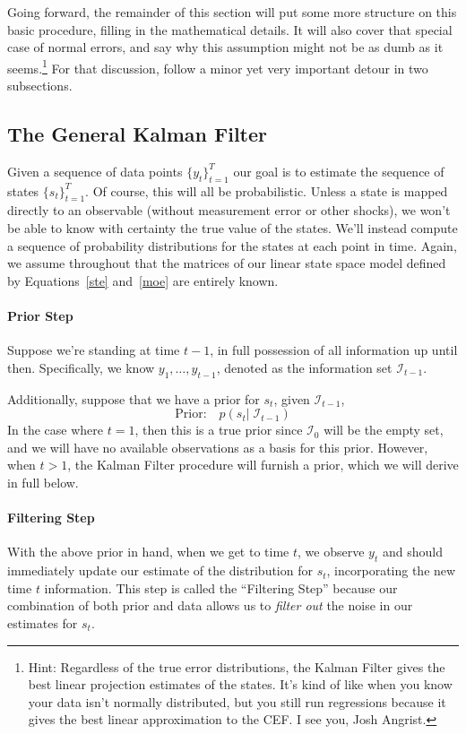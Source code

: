\documentclass[a4paper,12pt]{article}
\begin{document}
Going forward, the remainder of this section will put some more
structure on this basic procedure, filling in the mathematical details.
It will also cover that special case of normal errors, and say why this
assumption might not be as dumb as it seems.\footnote{Hint: Regardless
of the true error distributions, the Kalman Filter gives the best linear
projection estimates of the states. It's kind of like when you know your
data isn't normally distributed, but you still run regressions because
it gives the best linear approximation to the CEF. I see you, Josh
Angrist.} For that discussion, follow a minor yet very important detour
in two subsections.


\subsection{The General Kalman Filter}
\label{subsec:kfdetails}

Given a sequence of data points $\{y_t\}_{t=1}^T$ our goal is to
estimate the sequence of states $\{s_t\}^T_{t=1}$. Of course, this will
all be probabilistic. Unless a state is mapped directly to an
observable (without measurement error or other shocks), we won't be able
to know with certainty the true value of the states. We'll instead
compute a sequence of probability distributions for the states at each
point in time. Again, we assume throughout that the matrices of our
linear state space model defined by Equations~\ref{ste}
and~\ref{moe} are entirely known.


\paragraph{Prior Step} Suppose we're standing at time $t-1$, in full possession of all information up until then. Specifically, we know $y_1, \ldots, y_{t-1}$, denoted as the information set $\mathcal{I}_{t-1}$.

Additionally, suppose that we have a prior for $s_t$, given $\mathcal{I}_{t-1}$,
\begin{equation}
  \text{Prior:} \quad p(s_t | \; \mathcal{I}_{t-1})
  \label{pri}
\end{equation}
In the case where $t=1$, then this is a true prior since $\mathcal{I}_{0}$ will be the empty set, and we will have no available observations as a basis for this prior. However, when $t>1$, the Kalman Filter procedure will furnish a prior, which we will derive in full below.

\paragraph{Filtering Step}
With the above prior in hand, when we get to time $t$, we observe $y_t$ and should immediately update our estimate of the distribution for $s_t$, incorporating the new time $t$ information. This step is called the ``Filtering Step'' because our combination of both prior and data allows us to \emph{filter out} the noise in our estimates for $s_t$.
\end{document}
